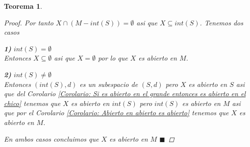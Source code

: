 \documentclass[oneside]{book} %
\theoremstyle{Teorema}
\newtheorem{Teorema}[Definicion]{Teorema}
\theoremstyle{Ejemplos}
\theoremstyle{[Obs]}
\renewcommand{\{}{\left\lbrace} %
\renewcommand{\}}{\right\rbrace} %
\newcommand{\n}{\cap} %
\renewcommand{\sc}{\subseteq} %
\renewcommand{\qed}{$\blacksquare$} %
\begin{document}
\begin{Teorema}
\begin{proof}
					Por tanto $X \n (M - int(S)) = \emptyset$ asi que $X \sc int(S)$. Tenemos dos casos 

					\textbf{1)} $int(S) = \emptyset$ \\ 
					Entonces $X \sc \emptyset$ asi que $X = \emptyset$ por lo que $X$ es abierto en $M$.

					\textbf{2)} $int(S) \neq \emptyset$ \\ 
					Entonces $(int(S), d)$ es un subespacio de $(S, d)$ pero $X$ es abierto en $S$ asi que del Corolario \ref{Corolario: Si es abierto en el grande entonces es abierto en el chico} tenemos que $X$ es abierto en $int(S)$ pero $int(S)$ es abierto en $M$ asi que por el Corolario \ref{Corolario: Abierto en abierto es abierto} tenemos que $X$ es abierto en $M$.

					En ambos casos concluimos que $X$ es abierto en $M$ \qed

				\end{proof}
			
			\end{Teorema}
\end{document}
